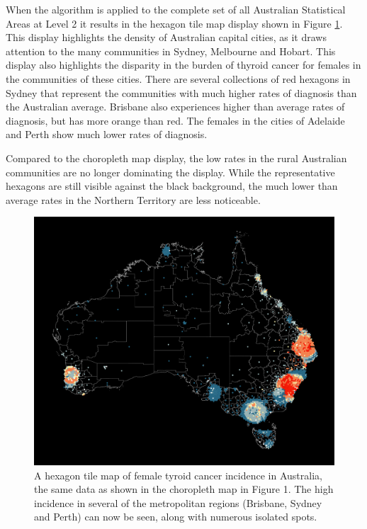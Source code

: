 When the algorithm is applied to the complete set of all Australian
Statistical Areas at Level 2 it results in the hexagon tile map display
shown in Figure \ref{fig:hexmap}. This display highlights the density of
Australian capital cities, as it draws attention to the many communities
in Sydney, Melbourne and Hobart. This display also highlights the
disparity in the burden of thyroid cancer for females in the communities
of these cities. There are several collections of red hexagons in Sydney
that represent the communities with much higher rates of diagnosis than
the Australian average. Brisbane also experiences higher than average
rates of diagnosis, but has more orange than red. The females in the
cities of Adelaide and Perth show much lower rates of diagnosis.

Compared to the choropleth map display, the low rates in the rural
Australian communities are no longer dominating the display. While the
representative hexagons are still visible against the black background,
the much lower than average rates in the Northern Territory are less
noticeable.

\begin{Schunk}
\begin{figure}
\includegraphics[width=0.95\linewidth]{kobakian-cook_files/figure-latex/hexmap-1} \caption[A hexagon tile map of female tyroid cancer incidence in Australia, the same data as shown in the choropleth map in Figure 1]{A hexagon tile map of female tyroid cancer incidence in Australia, the same data as shown in the choropleth map in Figure 1. The high incidence in several of the metropolitan regions (Brisbane, Sydney and Perth) can now be seen, along with numerous isolated spots.}\label{fig:hexmap}
\end{figure}
\end{Schunk}

